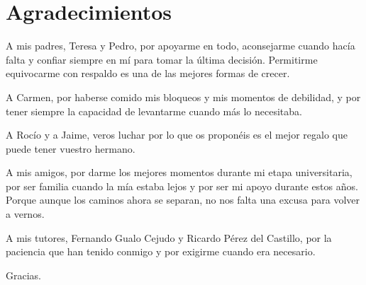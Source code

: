 \chapter{Agradecimientos}

A mis padres, Teresa y Pedro, por apoyarme en todo, aconsejarme cuando hacía falta y confiar siempre en mí para tomar la última decisión. Permitirme equivocarme con respaldo es una de las mejores formas de crecer.

A Carmen, por haberse comido mis bloqueos y mis momentos de debilidad, y por tener siempre la capacidad de levantarme cuando más lo necesitaba.

A Rocío y a Jaime, veros luchar por lo que os proponéis es el mejor regalo que puede tener vuestro hermano.

A mis amigos, por darme los mejores momentos durante mi etapa universitaria, por ser familia cuando la mía estaba lejos y por ser mi apoyo durante estos años. Porque aunque los caminos ahora se separan, no nos falta una excusa para volver a vernos.

A mis tutores, Fernando Gualo Cejudo y Ricardo Pérez del Castillo, por la paciencia que han tenido conmigo y por exigirme cuando era necesario.

\bigskip
\noindent Gracias.


